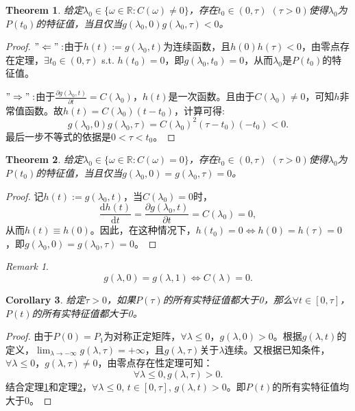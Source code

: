 \documentclass[UTF8]{ctexart}
\theoremstyle{plain}
\newtheorem{thm}{Theorem}
\newtheorem{cor}[thm]{Corollary}
\theoremstyle{definition}
\theoremstyle{remark}
\newtheorem*{rem}{Remark}
\newcommand{\dif}{\mathrm{d}}
\newcommand{\difFrac}[2]{\frac{\dif #1}{\dif #2}}
\newcommand{\pdfFrac}[2]{\frac{\partial #1}{\partial #2}}
\begin{document}
\begin{thm}
    \label{thm1}
    给定$\lambda_{0}\in\{\omega\in\mathbb{R}:C(\omega)\neq 0\}$，存在$t_{0}\in (0,\tau)$ $(\tau>0)$使得$\lambda_{0}$为$P(t_{0})$的特征值，当且仅当$g(\lambda_{0},0)g(\lambda_{0},\tau)<0$。
\end{thm}
\begin{proof}
    $"\Leftarrow":$由于$h(t):=g(\lambda_{0},t)$为连续函数，且$h(0)h(\tau)<0$，由零点存在定理，$\exists t_{0}\in(0,\tau)$ s.t. $h(t_{0})=0$，即$g(\lambda_{0},t_{0})=0$，从而$\lambda_{0}$是$P(t_{0})$的特征值。

    $"\Rightarrow":$由于$\pdfFrac{g(\lambda_{0},t)}{t}=C(\lambda_{0})$，$h(t)$是一次函数。且由于$C(\lambda_{0})\neq 0$，可知$h$非常值函数。故$h(t)=C(\lambda_{0})(t-t_{0})$，计算可得:
    \begin{equation}
        g(\lambda_{0},0)g(\lambda_{0},\tau)=C(\lambda_{0})^{2}(\tau-t_{0})(-t_{0})<0.
    \end{equation}
    最后一步不等式的依据是$0<\tau<t_{0}$。
\end{proof}
\begin{thm}
    \label{thm2}
    给定$\lambda_{0}\in\{\omega\in\mathbb{R}:C(\omega)=0\}$，存在$t_{0}\in(0,\tau)$ $(\tau>0)$使得$\lambda_{0}$为$P(t_{0})$的特征值，当且仅当$g(\lambda_{0},0)=g(\lambda_{0},\tau)=0$。
\end{thm}
\begin{proof}
    记$h(t):=g(\lambda_{0},t)$，当$C(\lambda_{0})=0$时，
    \begin{equation}
        \difFrac{h(t)}{t}=\pdfFrac{g(\lambda_{0},t)}{t}=C(\lambda_{0})=0,
    \end{equation}
    从而$h(t)\equiv h(0)$。因此，在这种情况下，$h(t_{0})=0\Leftrightarrow h(0)=h(\tau)=0$，即$g(\lambda_{0},0)=g(\lambda_{0},\tau)=0$。
\end{proof}
\begin{rem}
    \begin{equation}
        g(\lambda,0)=g(\lambda,1)\Leftrightarrow C(\lambda)=0.
    \end{equation}
\end{rem}
\begin{cor}
    给定$\tau>0$，如果$P(\tau)$的所有实特征值都大于0，那么$\forall t\in[0,\tau]$，$P(t)$的所有实特征值都大于0。
\end{cor}
\begin{proof}
    由于$P(0)=P_{1}$为对称正定矩阵，$\forall\lambda\le 0$，$g(\lambda,0)>0$。根据$g(\lambda,t)$的定义，$\lim_{\lambda\rightarrow -\infty}g(\lambda,\tau)=+\infty$，且$g(\lambda,\tau)$关于$\lambda$连续。又根据已知条件，$\forall\lambda\le0$，$g(\lambda,\tau)\neq 0$，由零点存在性定理可知：
    \begin{equation}
        \forall\lambda\le 0,g(\lambda,\tau)>0.
    \end{equation}
    结合定理\ref{thm1}和定理\ref{thm2}，$\forall\lambda\le 0$, $t\in[0,\tau]$, $g(\lambda,t)>0$。即$P(t)$的所有实特征值均大于0。
\end{proof}
\end{document}
